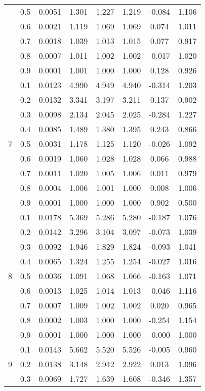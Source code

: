 \documentclass[11pt,a4paper]{report}
\begin{document}
\begin{longtable}{ | c | c || c | c | c | c | c | c | }
 & 0.5 & 0.0051 & 1.301 & 1.227 & 1.219 & -0.084 & 1.106 \\
 & 0.6 & 0.0021 & 1.119 & 1.069 & 1.069 & 0.074 & 1.011 \\
 & 0.7 & 0.0018 & 1.039 & 1.013 & 1.015 & 0.077 & 0.917 \\
 & 0.8 & 0.0007 & 1.011 & 1.002 & 1.002 & -0.017 & 1.020 \\
 & 0.9 & 0.0001 & 1.001 & 1.000 & 1.000 & 0.128 & 0.926 \\
 \hline
\multirow{9}{*}{7} & 0.1 & 0.0123 & 4.990 & 4.949 & 4.940 & -0.314 & 1.203 \\
 & 0.2 & 0.0132 & 3.341 & 3.197 & 3.211 & 0.137 & 0.902 \\
 & 0.3 & 0.0098 & 2.134 & 2.045 & 2.025 & -0.284 & 1.227 \\
 & 0.4 & 0.0085 & 1.489 & 1.380 & 1.395 & 0.243 & 0.866 \\
 & 0.5 & 0.0031 & 1.178 & 1.125 & 1.120 & -0.026 & 1.092 \\
 & 0.6 & 0.0019 & 1.060 & 1.028 & 1.028 & 0.066 & 0.988 \\
 & 0.7 & 0.0011 & 1.020 & 1.005 & 1.006 & 0.011 & 0.979 \\
 & 0.8 & 0.0004 & 1.006 & 1.001 & 1.000 & 0.008 & 1.006 \\
 & 0.9 & 0.0001 & 1.000 & 1.000 & 1.000 & 0.902 & 0.500 \\
 \hline
\multirow{9}{*}{8} & 0.1 & 0.0178 & 5.369 & 5.286 & 5.280 & -0.187 & 1.076 \\
 & 0.2 & 0.0142 & 3.296 & 3.104 & 3.097 & -0.073 & 1.039 \\
 & 0.3 & 0.0092 & 1.946 & 1.829 & 1.824 & -0.093 & 1.041 \\
 & 0.4 & 0.0065 & 1.324 & 1.255 & 1.254 & -0.027 & 1.016 \\
 & 0.5 & 0.0036 & 1.091 & 1.068 & 1.066 & -0.163 & 1.071 \\
 & 0.6 & 0.0013 & 1.025 & 1.014 & 1.013 & -0.046 & 1.116 \\
 & 0.7 & 0.0007 & 1.009 & 1.002 & 1.002 & 0.020 & 0.965 \\
 & 0.8 & 0.0002 & 1.003 & 1.000 & 1.000 & -0.254 & 1.154 \\
 & 0.9 & 0.0001 & 1.000 & 1.000 & 1.000 & -0.000 & 1.000 \\
 \hline
\multirow{9}{*}{9} & 0.1 & 0.0143 & 5.662 & 5.520 & 5.526 & -0.005 & 0.960 \\
 & 0.2 & 0.0138 & 3.148 & 2.942 & 2.922 & 0.013 & 1.096 \\
 & 0.3 & 0.0069 & 1.727 & 1.639 & 1.608 & -0.346 & 1.357 \\

\end{longtable}
\end{document}
